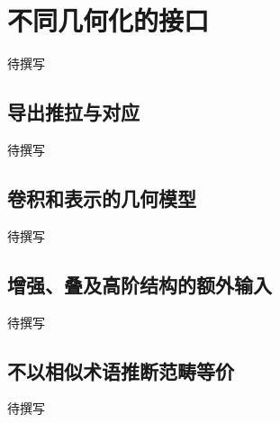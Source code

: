 
% 
% 
% 

\section{不同几何化的接口}
\label{g5:sec:3604}

待撰写

\subsection{导出推拉与对应}
\label{g5:subsec:3604:01}
待撰写

\subsection{卷积和表示的几何模型}
\label{g5:subsec:3604:02}
待撰写

\subsection{增强、叠及高阶结构的额外输入}
\label{g5:subsec:3604:03}
待撰写

\subsection{不以相似术语推断范畴等价}
\label{g5:subsec:3604:04}
待撰写
